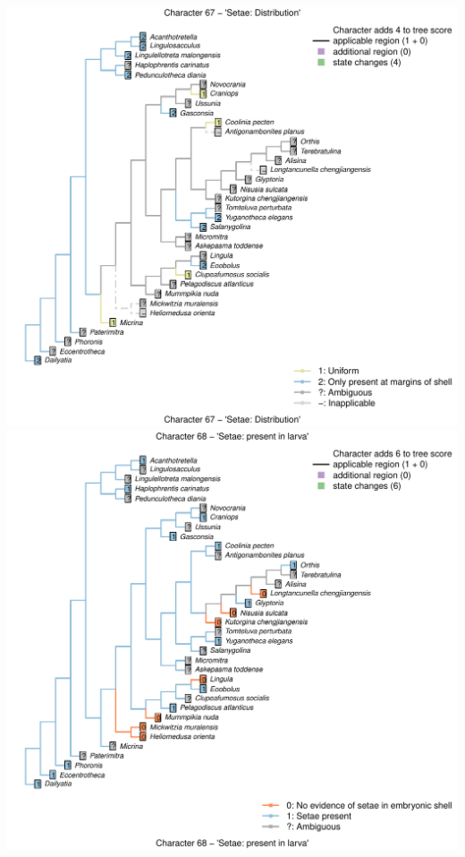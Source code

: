\documentclass[]{book}
\theoremstyle{definition}
\theoremstyle{definition}
\theoremstyle{definition}
\theoremstyle{remark}
\begin{document}
\includegraphics{Brachiopod_phylogeny_files/figure-latex/unnamed-chunk-4-67.pdf}
\includegraphics{Brachiopod_phylogeny_files/figure-latex/unnamed-chunk-4-68.pdf}
\end{document}
